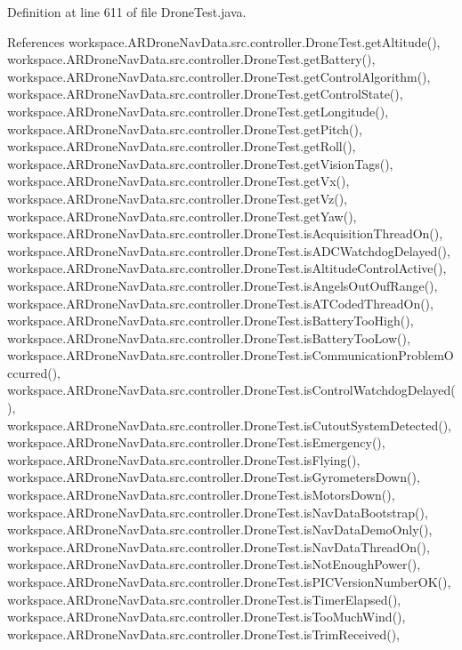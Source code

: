 Definition at line 611 of file Drone\+Test.\+java.



References workspace.\+A\+R\+Drone\+Nav\+Data.\+src.\+controller.\+Drone\+Test.\+get\+Altitude(), workspace.\+A\+R\+Drone\+Nav\+Data.\+src.\+controller.\+Drone\+Test.\+get\+Battery(), workspace.\+A\+R\+Drone\+Nav\+Data.\+src.\+controller.\+Drone\+Test.\+get\+Control\+Algorithm(), workspace.\+A\+R\+Drone\+Nav\+Data.\+src.\+controller.\+Drone\+Test.\+get\+Control\+State(), workspace.\+A\+R\+Drone\+Nav\+Data.\+src.\+controller.\+Drone\+Test.\+get\+Longitude(), workspace.\+A\+R\+Drone\+Nav\+Data.\+src.\+controller.\+Drone\+Test.\+get\+Pitch(), workspace.\+A\+R\+Drone\+Nav\+Data.\+src.\+controller.\+Drone\+Test.\+get\+Roll(), workspace.\+A\+R\+Drone\+Nav\+Data.\+src.\+controller.\+Drone\+Test.\+get\+Vision\+Tags(), workspace.\+A\+R\+Drone\+Nav\+Data.\+src.\+controller.\+Drone\+Test.\+get\+Vx(), workspace.\+A\+R\+Drone\+Nav\+Data.\+src.\+controller.\+Drone\+Test.\+get\+Vz(), workspace.\+A\+R\+Drone\+Nav\+Data.\+src.\+controller.\+Drone\+Test.\+get\+Yaw(), workspace.\+A\+R\+Drone\+Nav\+Data.\+src.\+controller.\+Drone\+Test.\+is\+Acquisition\+Thread\+On(), workspace.\+A\+R\+Drone\+Nav\+Data.\+src.\+controller.\+Drone\+Test.\+is\+A\+D\+C\+Watchdog\+Delayed(), workspace.\+A\+R\+Drone\+Nav\+Data.\+src.\+controller.\+Drone\+Test.\+is\+Altitude\+Control\+Active(), workspace.\+A\+R\+Drone\+Nav\+Data.\+src.\+controller.\+Drone\+Test.\+is\+Angels\+Out\+Ouf\+Range(), workspace.\+A\+R\+Drone\+Nav\+Data.\+src.\+controller.\+Drone\+Test.\+is\+A\+T\+Coded\+Thread\+On(), workspace.\+A\+R\+Drone\+Nav\+Data.\+src.\+controller.\+Drone\+Test.\+is\+Battery\+Too\+High(), workspace.\+A\+R\+Drone\+Nav\+Data.\+src.\+controller.\+Drone\+Test.\+is\+Battery\+Too\+Low(), workspace.\+A\+R\+Drone\+Nav\+Data.\+src.\+controller.\+Drone\+Test.\+is\+Communication\+Problem\+Occurred(), workspace.\+A\+R\+Drone\+Nav\+Data.\+src.\+controller.\+Drone\+Test.\+is\+Control\+Watchdog\+Delayed(), workspace.\+A\+R\+Drone\+Nav\+Data.\+src.\+controller.\+Drone\+Test.\+is\+Cutout\+System\+Detected(), workspace.\+A\+R\+Drone\+Nav\+Data.\+src.\+controller.\+Drone\+Test.\+is\+Emergency(), workspace.\+A\+R\+Drone\+Nav\+Data.\+src.\+controller.\+Drone\+Test.\+is\+Flying(), workspace.\+A\+R\+Drone\+Nav\+Data.\+src.\+controller.\+Drone\+Test.\+is\+Gyrometers\+Down(), workspace.\+A\+R\+Drone\+Nav\+Data.\+src.\+controller.\+Drone\+Test.\+is\+Motors\+Down(), workspace.\+A\+R\+Drone\+Nav\+Data.\+src.\+controller.\+Drone\+Test.\+is\+Nav\+Data\+Bootstrap(), workspace.\+A\+R\+Drone\+Nav\+Data.\+src.\+controller.\+Drone\+Test.\+is\+Nav\+Data\+Demo\+Only(), workspace.\+A\+R\+Drone\+Nav\+Data.\+src.\+controller.\+Drone\+Test.\+is\+Nav\+Data\+Thread\+On(), workspace.\+A\+R\+Drone\+Nav\+Data.\+src.\+controller.\+Drone\+Test.\+is\+Not\+Enough\+Power(), workspace.\+A\+R\+Drone\+Nav\+Data.\+src.\+controller.\+Drone\+Test.\+is\+P\+I\+C\+Version\+Number\+O\+K(), workspace.\+A\+R\+Drone\+Nav\+Data.\+src.\+controller.\+Drone\+Test.\+is\+Timer\+Elapsed(), workspace.\+A\+R\+Drone\+Nav\+Data.\+src.\+controller.\+Drone\+Test.\+is\+Too\+Much\+Wind(), workspace.\+A\+R\+Drone\+Nav\+Data.\+src.\+controller.\+Drone\+Test.\+is\+Trim\+Received(), 